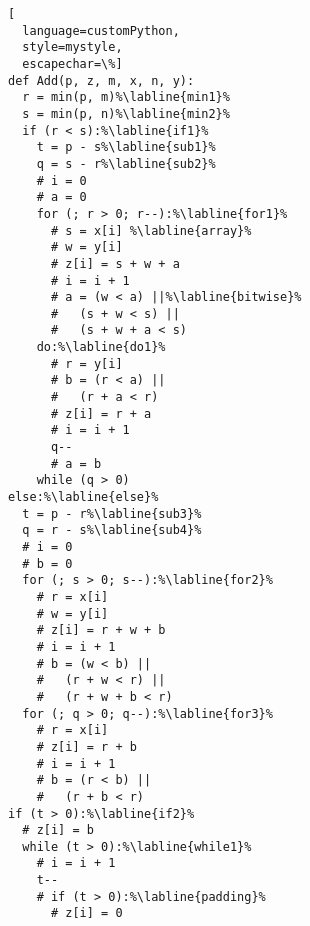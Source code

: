 \begin{lstlisting}[
  language=customPython,
  style=mystyle,
  escapechar=\%]
def Add(p, z, m, x, n, y):
  r = min(p, m)%\labline{min1}%
  s = min(p, n)%\labline{min2}%
  if (r < s):%\labline{if1}%
    t = p - s%\labline{sub1}%
    q = s - r%\labline{sub2}%
    # i = 0
    # a = 0
    for (; r > 0; r--):%\labline{for1}%
      # s = x[i] %\labline{array}%
      # w = y[i]
      # z[i] = s + w + a
      # i = i + 1
      # a = (w < a) ||%\labline{bitwise}%
      #   (s + w < s) ||
      #   (s + w + a < s)
    do:%\labline{do1}%
      # r = y[i]
      # b = (r < a) ||
      #   (r + a < r)
      # z[i] = r + a
      # i = i + 1
      q--
      # a = b
    while (q > 0)
else:%\labline{else}%
  t = p - r%\labline{sub3}%
  q = r - s%\labline{sub4}%
  # i = 0
  # b = 0
  for (; s > 0; s--):%\labline{for2}%
    # r = x[i]
    # w = y[i]
    # z[i] = r + w + b
    # i = i + 1
    # b = (w < b) ||
    #   (r + w < r) ||
    #   (r + w + b < r)
  for (; q > 0; q--):%\labline{for3}%
    # r = x[i]
    # z[i] = r + b
    # i = i + 1
    # b = (r < b) ||
    #   (r + b < r)
if (t > 0):%\labline{if2}%
  # z[i] = b
  while (t > 0):%\labline{while1}%
    # i = i + 1
    t--
    # if (t > 0):%\labline{padding}%
      # z[i] = 0
\end{lstlisting}
